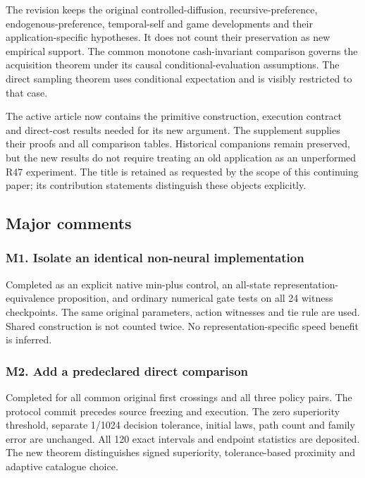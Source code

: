 \documentclass[ecta,nameyear,draft]{econsocart}
\begin{document}
The revision keeps the original controlled-diffusion,
recursive-preference, endogenous-preference, temporal-self and game
developments and their application-specific hypotheses. It does not
count their preservation as new empirical support. The common monotone
cash-invariant comparison governs the acquisition theorem under its
causal conditional-evaluation assumptions. The direct sampling theorem
uses conditional expectation and is visibly restricted to that case.

The active article now contains the primitive construction, execution
contract and direct-cost results needed for its new argument. The
supplement supplies their proofs and all comparison tables. Historical
companions remain preserved, but the new results do not require treating
an old application as an unperformed R47 experiment. The title is
retained as requested by the scope of this continuing paper; its
contribution statements distinguish these objects explicitly.

\hypertarget{major-comments}{%
\subsection{Major comments}\label{major-comments}}

\hypertarget{m1-isolate-an-identical-non-neural-implementation}{%
\subsubsection{M1. Isolate an identical non-neural
implementation}\label{m1-isolate-an-identical-non-neural-implementation}}

Completed as an explicit native min-plus control, an all-state
representation-equivalence proposition, and ordinary numerical gate
tests on all 24 witness checkpoints. The same original parameters,
action witnesses and tie rule are used. Shared construction is not
counted twice. No representation-specific speed benefit is inferred.

\hypertarget{m2-add-a-predeclared-direct-comparison}{%
\subsubsection{M2. Add a predeclared direct
comparison}\label{m2-add-a-predeclared-direct-comparison}}

Completed for all common original first crossings and all three policy
pairs. The protocol commit precedes source freezing and execution. The
zero superiority threshold, separate 1/1024 decision tolerance, initial
laws, path count and family error are unchanged. All 120 exact intervals
and endpoint statistics are deposited. The new theorem distinguishes
signed superiority, tolerance-based proximity and adaptive catalogue
choice.
\end{document}
